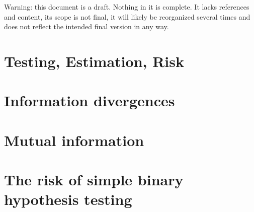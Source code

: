 
%

Warning: this document is a draft. Nothing in it is complete. It lacks references and content, its scope is not final, it will likely be reorganized several times and does not reflect the intended final version in any way.



\chapter{Testing, Estimation, Risk}




\chapter{Information divergences}















\chapter{Mutual information}



\chapter{The risk of simple binary hypothesis testing}

